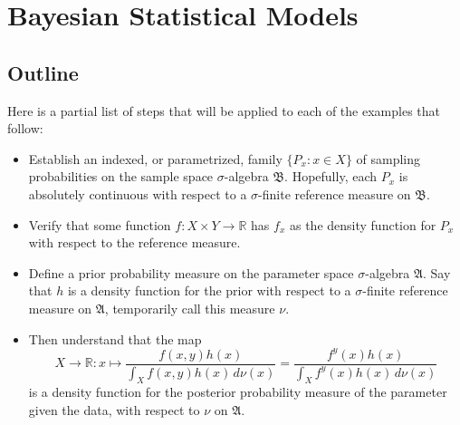 \documentclass[
twoside=true,
paper=letter,
fontsize=9pt,
pagesize=auto,
leqno,
openany,
headsepline,
overfullrule,
]{scrbook}
\theoremstyle{plain}
\theoremstyle{plain}
\theoremstyle{definition}
\theoremstyle{bfnoteitalic}
\theoremstyle{bfnoteroman}
\newcommand{\sigalg}[1]{\mathfrak{#1}}
\newcommand{\textsigma}{\hbox{\large{$\sigma$}}\kern-1pt}
\newcommand{\R}{\mathbb{R}}
\newcommand{\funcf}{f}
\newcommand{\funch}{h}
\newcommand{\function}{f}
\newcommand{\functioniii}{h}
\newcommand{\measurespace}{X}
\newcommand{\measurespaceii}{Y}
\newcommand{\measureii}{\nu}
\newcommand{\measnu}{\nu}
\newcommand{\pspace}{\measurespace}%
\newcommand{\sspace}{\measurespaceii}%
\newcommand{\pspaceelt}{x}
\newcommand{\sspaceelt}{y}
\newcommand{\sspacesig}{\sigalg{B}}
\newcommand{\pspacesig}{\sigalg{A}}
\begin{document}
\chapter{Bayesian Statistical Models}\label{bayesian_statistical_models_examples}


\section{Outline}
Here is a partial list of steps that will be applied to each of the examples that follow:
\begin{itemize}
\item
Establish an indexed, or parametrized, family
$\{ P_\pspaceelt :\pspaceelt\in\pspace \}$
of sampling probabilities on the sample space \textsigma-algebra 
$\sspacesig$. Hopefully, each
$P_\pspaceelt$
is absolutely continuous with respect to a \textsigma-finite reference measure on $\sspacesig$.
\item
Verify that some function
$\function : \pspace\times\sspace\to\R$
has $\funcf_\pspaceelt$ as  the density function for
$P_\pspaceelt$ with respect to the reference measure.
\item
Define a prior probability measure on the parameter space \textsigma-algebra
$\pspacesig$.
Say that $\funch$ is a density function for the prior with respect to a \textsigma-finite reference measure on $\pspacesig$, temporarily call this measure $\measnu$.
\item
Then understand that the map
\[
\pspace\to\R:
\pspaceelt
\mapsto
\frac{\function(\pspaceelt,\sspaceelt)\functioniii(\pspaceelt)}
{\displaystyle
\int_{\pspace} \function(\pspaceelt,\sspaceelt)\functioniii(\pspaceelt)
\,d\measureii(\pspaceelt)}
=
\frac{\function^\sspaceelt(\pspaceelt)\functioniii(\pspaceelt)}
{\displaystyle
\int_{\pspace} \function^\sspaceelt(\pspaceelt)\functioniii(\pspaceelt)
\,d\measureii(\pspaceelt)}
\]
is a density function for the posterior probability measure of the parameter given the data,
with respect to $\measnu$ on $\pspacesig$.
\end{itemize}



\end{document}
